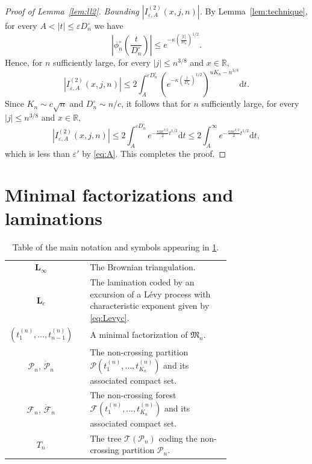 \documentclass[10pt]{amsart}
\theoremstyle{definition}\newtheorem{defi}[theo]{Definition}\newtheorem{rema}[theo]{Remark}\newtheorem{exam}[theo]{Example}\newtheorem{exem}[theo]{Example}\newtheorem{nota}[theo]{Notation}
\newcommand{\R}{\mathbb{R}}
\def\PPP{\mathcal P}
\def\FFF{\mathcal F}
\def\phicn{\phi^{\circ}_{n}}
\def\Dcn{D^{\circ}_{n}}
\renewcommand{\epsilon}{\varepsilon}
\begin{document}
\begin{proof}[Proof of Lemma~\ref{lem:ll2}]
 \emph{Bounding $|I^{(2)}_{\epsilon, {A} }(x,j,n)|$.}  By Lemma~\ref{lem:technique}, for every $A<|t| \leq \epsilon \Dcn$ we have \[  \left| \phicn \left(  \frac{t}{\Dcn} \right) \right|  \leq e^{-\kappa \left(  \frac{|t|}{\Dcn} \right) ^{1/2}}.\]
Hence, for $n$ sufficiently large, for every $|j| \leq n^{3/8}$ and $x \in \R$,
 \[ \left| I^{(2)}_{\epsilon,A}(x,j,n)  \right| \leq 2 \int_{A}^{\epsilon \Dcn}\left( e^{-\kappa  \left(  \frac{t}{\Dcn} \right) ^{1/2}} \right) ^{ uK_{n}  -n^{3/8}} \mathrm{d}t .\]
 Since $K_{n} \sim c \sqrt{n}$ and $ \Dcn\sim  n /c$, it follows that for $n$ sufficiently large, for every $|j| \leq n^{3/8}$ and $x \in \R$,
  \[ \left| I^{(2)}_{\epsilon,A}(x,j,n) \right| \leq 2 \int_{A}^{\epsilon \Dcn}  e^{- \frac{\kappa u  c^{3/2}}{2} t^{1/2}} \mathrm{d}t  \leq 2 \int_{A}^{\infty} e^{- \frac{\kappa u c^{3/2}}{2} t^{1/2}} \mathrm{d}t,\]
  which is less than $\epsilon'$ by \eqref{eq:A}.   This completes the proof.
  \end{proof}







\section{Minimal factorizations and  laminations}
\label{sec:lam}


\begin{table}[htbp]\caption{Table of the main notation and symbols appearing in \cref{sec:lam}.}
\centering
\begin{tabular}{c c p{0.73 \linewidth} }
\toprule
$\mathbf{L}_{\infty} $ & & The Brownian triangulation. \\
$\mathbf{L}_{c} $ && The lamination coded by an excursion of a L\'evy process with characteristic exponent given by \eqref{eq:Levyc}.\\
$(t_{1}^{(n)}, \ldots, t_{n-1}^{(n)})$  && A minimal factorization of $\mathfrak{M}_{n}$.\\
$ \PPP_{n}$, $ \dot{\PPP}_{n}$  && The non-crossing partition $ \PPP(  t_{1}^{(n)}, \ldots, t_{K_{n}}^{(n)})$ and its associated compact set. \\
$ \FFF_{n}$, $\dot{ \FFF}_{n}$&&  The non-crossing forest $ \FFF(  t_{1}^{(n)}, \ldots, t_{K_{n}}^{(n)})$ and its associated compact set.\\
$T_{n}$   &&  The tree $ \mathcal{T}(  \PPP_{n})$   coding the non-crossing partition $ \PPP_{n}$.\\
\bottomrule
\end{tabular}
\label{tab:seclam}
\end{table}
\end{document}
